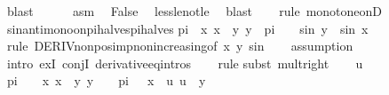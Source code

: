 \begin{isabellebody}
\ blast\isanewline
\isanewline
\ \ \ \ \isamarkupfalse%
\ asm{\isacharparenleft}{\kern0pt}{}{\isacharparenright}{\kern0pt}\ \isamarkupfalse%
\ False\ \isamarkupfalse%
\ less{\isacharunderscore}{\kern0pt}le{\isacharunderscore}{\kern0pt}not{\isacharunderscore}{\kern0pt}le\ \isamarkupfalse%
\ blast\isanewline
\ \ \isamarkupfalse%
\isanewline
{}\isamarkupfalse%
\ {\isacharparenleft}{\kern0pt}rule\ monotone{\isacharunderscore}{\kern0pt}onD{\isacharparenright}{\kern0pt}%
\endisatagproof
{\isafoldproof}%
%
\isadelimproof
\isanewline
%
\endisadelimproof
\isanewline
{}\isamarkupfalse%
\ sin{\isacharunderscore}{\kern0pt}antimono{\isacharunderscore}{\kern0pt}on{\isacharunderscore}{\kern0pt}pi{\isacharunderscore}{\kern0pt}halves{\isacharunderscore}{\kern0pt}{}{\isacharunderscore}{\kern0pt}pi{\isacharunderscore}{\kern0pt}halves{\isacharcolon}{\kern0pt}\isanewline
{\isachardoublequoteopen}{\isasymlbrakk}pi{\isacharslash}{\kern0pt}{}\ {\isasymle}\ x{\isacharsemicolon}{\kern0pt}\ x\ {\isasymle}\ y{\isacharsemicolon}{\kern0pt}\ y\ {\isasymle}\ {}{\isacharasterisk}{\kern0pt}pi\ {\isacharslash}{\kern0pt}\ {}{\isasymrbrakk}\ {\isasymLongrightarrow}\ sin\ y\ {\isasymle}\ sin\ x{\isachardoublequoteclose}\ \isanewline
%
\isadelimproof
\isanewline
\ \ %
\endisadelimproof
%
\isatagproof
{}\isamarkupfalse%
\ {\isacharparenleft}{\kern0pt}rule\ DERIV{\isacharunderscore}{\kern0pt}nonpos{\isacharunderscore}{\kern0pt}imp{\isacharunderscore}{\kern0pt}nonincreasing{\isacharbrackleft}{\kern0pt}of\ x\ y\ sin{\isacharbrackright}{\kern0pt}{\isacharparenright}{\kern0pt}\isanewline
\ \ \isamarkupfalse%
\ {\isacharparenleft}{\kern0pt}assumption{\isacharparenright}{\kern0pt}\isanewline
\ \ \isamarkupfalse%
\ {\isacharparenleft}{\kern0pt}intro\ exI\ conjI\ derivative{\isacharunderscore}{\kern0pt}eq{\isacharunderscore}{\kern0pt}intros{\isacharparenright}{\kern0pt}\isanewline
\ \ \isamarkupfalse%
\ rule{\isacharplus}{\kern0pt}\isanewline
{}\isamarkupfalse%
{\isacharparenleft}{\kern0pt}subst\ mult{\isacharunderscore}{\kern0pt}{}{\isacharunderscore}{\kern0pt}right{\isacharparenright}{\kern0pt}\isanewline
\ \ \isamarkupfalse%
\ u\ \isamarkupfalse%
\ {\isachardoublequoteopen}pi\ {\isacharslash}{\kern0pt}\ {}\ {\isasymle}\ x{\isachardoublequoteclose}\ {\isachardoublequoteopen}x\ {\isasymle}\ y{\isachardoublequoteclose}\ {\isachardoublequoteopen}y\ {\isasymle}\ {}\ {\isacharasterisk}{\kern0pt}\ pi\ {\isacharslash}{\kern0pt}\ {}{\isachardoublequoteclose}\ {\isachardoublequoteopen}x\ {\isasymle}\ u{\isachardoublequoteclose}\ {\isachardoublequoteopen}u\ {\isasymle}\ y{\isachardoublequoteclose}\isanewline

\end{isabellebody}
